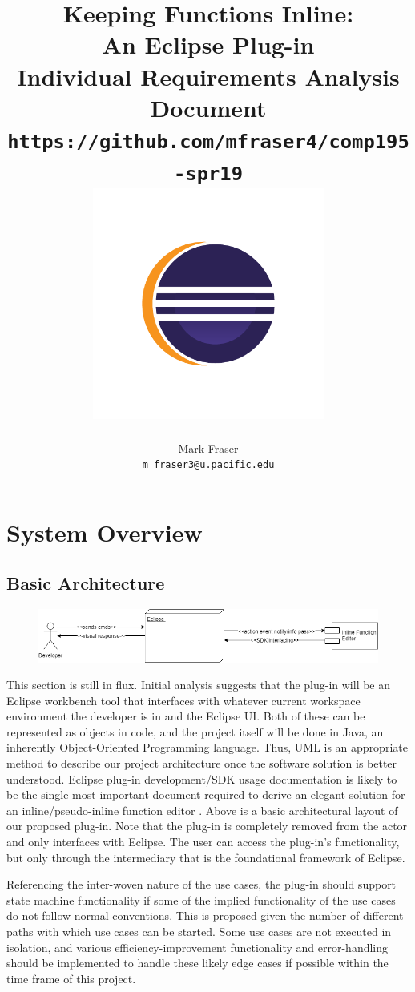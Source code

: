 \documentclass[]{report}
\title{Keeping Functions Inline:\\An Eclipse Plug-in\\ Individual Requirements Analysis Document\\ \vspace{1cm} \texttt{https://github.com/mfraser4/comp195-spr19} \\ \includegraphics[width=3in]{imgs/eclipse_logo.png}}
\author{Mark Fraser\\\texttt{m\_fraser3@u.pacific.edu}}
\begin{document}
\maketitle

\newpage
\tableofcontents
\newpage

\chapter{System Overview}

	\section{Basic Architecture}
	
		\begin{figure}[h!]
			\includegraphics[width=\linewidth]{imgs/basic_architecture.png}
		\end{figure}
	
		This section is still in flux.  Initial analysis suggests that the plug-in will be an Eclipse workbench tool that interfaces with whatever current workspace environment the developer is in and the Eclipse UI.  Both of these can be represented as objects in code, and the project itself will be done in Java, an inherently Object-Oriented Programming language.  Thus, UML is an appropriate method to describe our project architecture once the software solution is better understood.  Eclipse plug-in development/SDK usage documentation is likely to be the single most important document required to derive an elegant solution for an inline/pseudo-inline function editor \citep{eclipseFoundation}.  Above is a basic architectural layout of our proposed plug-in.  Note that the plug-in is completely removed from the actor and only interfaces with Eclipse.  The user can access the plug-in's functionality, but only through the intermediary that is the foundational framework of Eclipse.
		
		Referencing the inter-woven nature of the use cases, the plug-in should support state machine functionality if some of the implied functionality of the use cases do not follow normal conventions.  This is proposed given the number of different paths with which use cases can be started.  Some use cases are not executed in isolation, and various efficiency-improvement functionality and error-handling should be implemented to handle these likely edge cases if possible within the time frame of this project.
	
\end{document}
